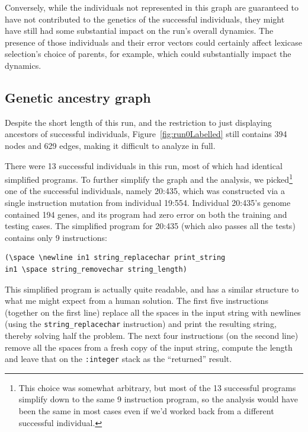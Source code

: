 \documentclass[graybox]{svmult}
\begin{document}
Conversely, while the individuals not represented in this graph are
guaranteed to have not contributed to the genetics of the successful
individuals, they might have still had some substantial impact on the
run's overall dynamics. The presence of those individuals and their
error vectors could certainly affect lexicase selection's choice of parents,
for example, which could substantially impact the dynamics.

\subsection{Genetic ancestry graph}

Despite the short length of this run, and the restriction to just displaying
ancestors of successful individuals, Figure~\ref{fig:run0Labelled} still
contains 394 nodes and 629 edges, making it difficult to analyze in full.

There were 13 successful individuals
in this run, most of which had identical simplified
programs. To further simplify the graph and the analysis, we picked\footnote{This choice 
	was somewhat arbitrary, but most of the 13 successful programs 
	simplify down to the same 9 instruction program, so the analysis would have 
	been the same in most cases even if we'd worked back from a different 
	successful individual.} 
one of the
successful individuals, namely 20:435, which was constructed via a single
instruction mutation from individual 19:554.
Individual 20:435's genome contained 194 genes, and its program had zero error on both
the training and testing cases.
The simplified program for 20:435 (which also passes all the tests)
contains only 9 instructions:
\begin{verbatim}
(\space \newline in1 string_replacechar print_string
in1 \space string_removechar string_length)
\end{verbatim}
This simplified program is actually quite readable, and has a similar
structure to what me might expect from a human solution.
The first five 
instructions (together on the first line) replace all the spaces in the input string 
with newlines (using the \texttt{string\_replacechar} instruction) and print the 
resulting string, thereby solving half the problem. 
The next four instructions (on the second line) remove all the spaces from
a fresh copy of the input string, compute the length and leave that on the
\texttt{:integer} stack as the ``returned'' result.
\end{document}
